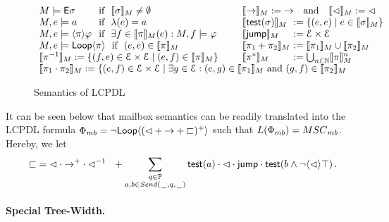 \documentclass[a4paper,UKenglish,cleveref, autoref, thm-restate]{lipics-v2021}
\begin{document}
\begin{figure}[t]
\centering
\def\arraystretch{1.2}
$\begin{array}{ll}
\makebox[5.5em][l]{$M \models \Exists \sigma$}  \text{~ if ~} \llbracket \sigma \rrbracket_\msc \neq \emptyset &
\llbracket \to \rrbracket_\msc := {\to} \text{~~ and ~~} \llbracket \lhd \rrbracket_\msc := {\lhd}\\
\makebox[5.5em][l]{$\msc, e \models a$} \text{~ if  ~} \lambda(e) = a &
\makebox[5em][l]{$\llbracket \test{\sigma} \rrbracket_\msc$} := \{ (e,e) \mid e \in \llbracket \sigma \rrbracket _\msc\}
\\
\makebox[5.5em][l]{$\msc, e \models \langle \pi \rangle \phi$} \text{~ if  ~} \exists f \in \llbracket \pi \rrbracket _\msc (e) : M, f \models \phi~~~~~ &
\makebox[5em][l]{$\llbracket \jump \rrbracket_\msc$} := \Events \times \Events\\
\msc, e \models \Loop{\pi} \text{~ if ~} (e, e) \in \llbracket \pi \rrbracket_\msc &
\makebox[5em][l]{$\llbracket \pi_1 + \pi_2 \rrbracket_\msc$} := \llbracket \pi_1\rrbracket_\msc \cup \llbracket \pi_2 \rrbracket_\msc \\
\multicolumn{1}{l}{\llbracket \inv{\pi} \rrbracket_\msc := \{ (f, e) \in \Events \times \Events \mid (e,f) \in \llbracket \pi \rrbracket_\msc\}} &
\makebox[5em][l]{$\llbracket \pi^* \rrbracket_\msc$} := \bigcup_{n \in \mathbb{N}}\llbracket \pi \rrbracket_\msc^n\\
\multicolumn{2}{l}{\llbracket \pi_1 \cdot \pi_2 \rrbracket_\msc := \{(e,f) \in \Events \times \Events \mid \exists g \in \Events : (e,g) \in \llbracket \pi_1 \rrbracket_\msc \text{~and~} (g, f) \in \llbracket \pi_2 \rrbracket_\msc  }
\end{array}$
\caption{Semantics of LCPDL\label{fig:sem-lcpdl}}
\end{figure}

It can be seen below that mailbox semantics can be readily translated into the LCPDL formula
$\mbFormula = \neg \Loop{({\lhd} + {\procrel} + {\sqsubset})^+}$
such that $L(\mbFormula) = \mbMSCs$. Hereby, we let
\[{\sqsubset} = {\lhd} \cdot {\to^+} \cdot {\lhd^{-1}} ~~+ \sum_{\substack{q \in \mathbb{P}\\a,b \in {\mathit{Send}(\hspace{0.1em}\underline{\hspace{0.5em}}\hspace{0.1em},q,\hspace{0.1em}\underline{\hspace{0.5em}}\hspace{0.1em})}}} \textsf{test}(a) \cdot {\lhd} \cdot \textsf{jump} \cdot \textsf{test}(b \wedge \neg \langle \lhd \rangle \top)\,.\]

\paragraph*{Special Tree-Width.}
\end{document}

